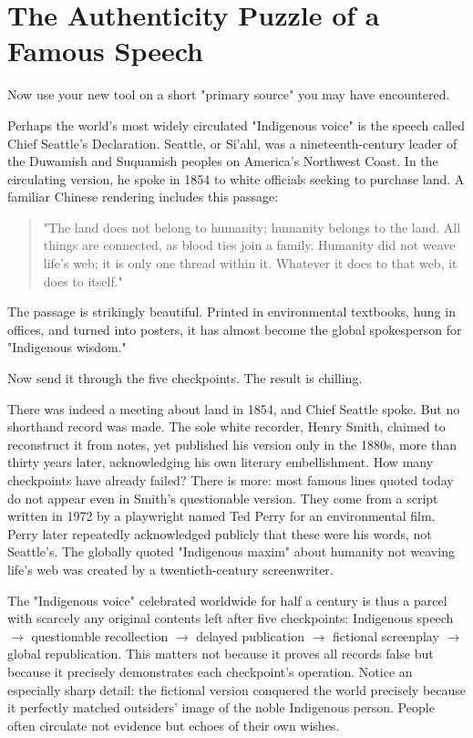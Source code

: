 \section{The Authenticity Puzzle of a Famous Speech}
Now use your new tool on a short "primary source" you may have encountered.

Perhaps the world's most widely circulated "Indigenous voice" is the speech called Chief Seattle's Declaration. Seattle, or Si'ahl, was a nineteenth-century leader of the Duwamish and Suquamish peoples on America's Northwest Coast. In the circulating version, he spoke in 1854 to white officials seeking to purchase land. A familiar Chinese rendering includes this passage:

\begin{quote}
"The land does not belong to humanity; humanity belongs to the land. All things are connected, as blood ties join a family. Humanity did not weave life's web; it is only one thread within it. Whatever it does to that web, it does to itself."
\end{quote}
The passage is strikingly beautiful. Printed in environmental textbooks, hung in offices, and turned into posters, it has almost become the global spokesperson for "Indigenous wisdom."

Now send it through the five checkpoints. The result is chilling.

There was indeed a meeting about land in 1854, and Chief Seattle spoke. But no shorthand record was made. The sole white recorder, Henry Smith, claimed to reconstruct it from notes, yet published his version only in the 1880s, more than thirty years later, acknowledging his own literary embellishment. How many checkpoints have already failed? There is more: most famous lines quoted today do not appear even in Smith's questionable version. They come from a script written in 1972 by a playwright named Ted Perry for an environmental film. Perry later repeatedly acknowledged publicly that these were his words, not Seattle's. The globally quoted "Indigenous maxim" about humanity not weaving life's web was created by a twentieth-century screenwriter.

The "Indigenous voice" celebrated worldwide for half a century is thus a parcel with scarcely any original contents left after five checkpoints: Indigenous speech $\rightarrow$ questionable recollection $\rightarrow$ delayed publication $\rightarrow$ fictional screenplay $\rightarrow$ global republication. This matters not because it proves all records false but because it precisely demonstrates each checkpoint's operation. Notice an especially sharp detail: the fictional version conquered the world precisely because it perfectly matched outsiders' image of the noble Indigenous person. People often circulate not evidence but echoes of their own wishes.

